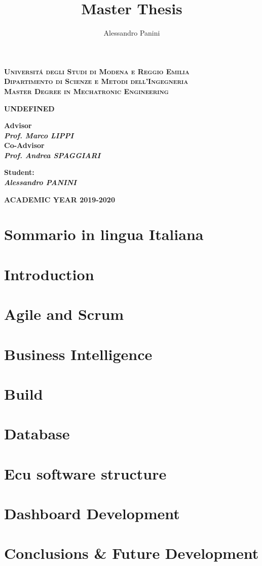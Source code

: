 \documentclass[a4paper,12pt,twoside]{report}
\title{\textbf{Master Thesis}}
\date{}
\author{Alessandro Panini}
\newlength{\drop}%
\newcommand*{\titleSal}%
{
	\begin{center}  
		\begingroup
		{\Large\bfseries\rmfamily\scshape Universit\'a degli Studi di Modena e Reggio Emilia}\\
		{\Large\bfseries\rmfamily\scshape Dipartimento di Scienze e Metodi dell'Ingegneria }\\[\baselineskip]
		\vspace*{1cm}
		\vspace*{\drop}
		{\Large\bfseries\rmfamily\scshape Master Degree in Mechatronic Engineering}\\[\baselineskip]
		\vspace*{\drop}
		
		\vspace*{3cm}
		
		\linespread{3}
        {\LARGE\bfseries\rmfamily UNDEFINED}\\
		\vspace*{4cm}
		
	\end{center}
	\vspace*{2cm}   
	\begin{minipage}[t]{0.5\textwidth}
		\begin{flushleft}
			{\small\bfseries Advisor}\\
			{\bfseries\itshape Prof. Marco LIPPI }\\
			{\small\bfseries Co-Advisor}\\
			{\bfseries\itshape Prof. Andrea SPAGGIARI}
		\end{flushleft}
	\end{minipage}
	\begin{minipage}[t]{0.4\textwidth}
		\begin{flushright} 
			{\bfseries\small Student:}\\
			{\bfseries\itshape Alessandro PANINI}
		\end{flushright}
	\end{minipage}  
	\vfill
	
	{\large\bfseries\rmfamily ACADEMIC YEAR 2019-2020}
	
	\endgroup
}
\begin{document}
	
\titleSal
\pagestyle{plain}

\newcommand*\rot{\multicolumn{1}{R{45}{1em}}}

	
	\newpage
	
	
	\tableofcontents
	\cleardoublepage


\chapter*{}



\chapter*{Sommario in lingua Italiana}

	

\chapter*{Introduction}



\chapter{Agile and Scrum}
	


\chapter{Business Intelligence}
	


\chapter{Build}
	

\chapter{Database}


\chapter{Ecu software structure}


\chapter{Dashboard Development}



\chapter{Conclusions \& Future Development}



\cleardoublepage




\listoffigures
\end{document}

